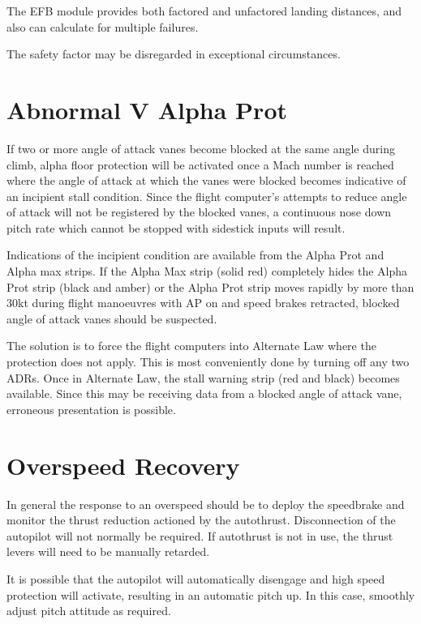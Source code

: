 \documentclass[a5paper,11pt,twoside]{book}
\newcommand{\inlcite}[1]{{\footnotesize\scshape\MakeLowercase{[#1]}}}
\newcommand{\multicite}[1]{%

  \nopagebreak
  \noindent{{\color{blue}\inlcite{#1}}}
}
\begin{document}
The EFB module provides both factored and unfactored landing distances, and also
can calculate for multiple failures.

The safety factor may be disregarded in exceptional circumstances.

\multicite{QRH~IFP, FCOM~PER.LDG, EOMB~4.14.2}

\section{Abnormal V Alpha Prot}

If two or more angle of attack vanes become blocked at the same angle during
climb, alpha floor protection will be activated once a Mach number is reached
where the angle of attack at which the vanes were blocked becomes indicative of
an incipient stall condition. Since the flight computer's attempts to reduce
angle of attack will not be registered by the blocked vanes, a continuous nose
down pitch rate which cannot be stopped with sidestick inputs will result.

Indications of the incipient condition are available from the Alpha Prot and
Alpha max strips. If the Alpha Max strip (solid red) completely hides the Alpha
Prot strip (black and amber) or the Alpha Prot strip moves rapidly by more than
30kt during flight manoeuvres with AP on and speed brakes retracted, blocked
angle of attack vanes should be suspected.

The solution is to force the flight computers into Alternate Law where the
protection does not apply. This is most conveniently done by turning off any two
ADRs. Once in Alternate Law, the stall warning strip (red and black) becomes
available. Since this may be receiving data from a blocked angle of attack vane,
erroneous presentation is possible.

\multicite{OEBPROC-48}

\section{Overspeed Recovery}

In general the response to an overspeed should be to deploy the speedbrake and
monitor the thrust reduction actioned by the autothrust. Disconnection of the
autopilot will not normally be required. If autothrust is not in use, the thrust
levers will need to be manually retarded.

It is possible that the autopilot will automatically disengage and high speed
protection will activate, resulting in an automatic pitch up. In this case,
smoothly adjust pitch attitude as required.
\end{document}
